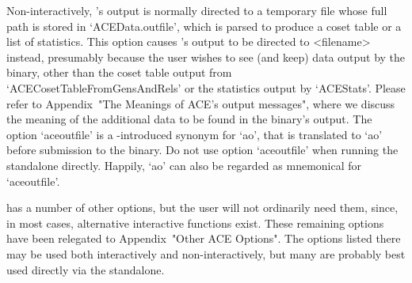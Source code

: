 Non-interactively, {\ACE}'s output is normally directed to a temporary
file whose full path is stored in `ACEData.outfile', which  is  parsed
to produce a coset table or a list of statistics. This  option  causes
{\ACE}'s output to  be  directed  to  <filename>  instead,  presumably
because the user wishes to see (and keep) data output  by  the  {\ACE}
binary,    other    than    the    coset     table     output     from
`ACECosetTableFromGensAndRels' or the statistics output by `ACEStats'.
Please refer to Appendix~"The  Meanings  of  ACE's  output  messages",
where we discuss the meaning of the additional data to be found in the
{\ACE} binary's output. The option `aceoutfile' is a {\GAP}-introduced
synonym for `ao', that is translated to `ao' before submission to  the
{\ACE} binary.  Do  not  use  option  `aceoutfile'  when  running  the
standalone directly. Happily, `ao' can also be regarded as  mnemonical
for `aceoutfile'.

\enditems


{\ACE} has a number of other options, but the  {\GAP}  user  will  not
ordinarily need them, since, in most  cases,  alternative  interactive
functions exist.  These  remaining  options  have  been  relegated  to
Appendix~"Other ACE Options". The options listed  there  may  be  used
both interactively and non-interactively, but many are  probably  best
used directly via the {\ACE} standalone.

